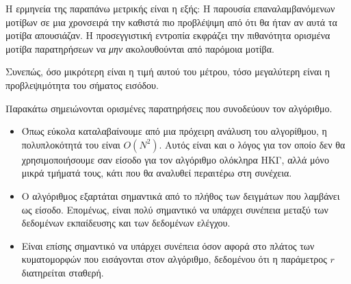 Η ερμηνεία της παραπάνω μετρικής είναι η εξής: Η παρουσία επαναλαμβανόμενων μοτίβων σε μια χρονσειρά την καθιστά πιο προβλέψιμη από ότι θα ήταν αν αυτά τα μοτίβα απουσιάζαν. Η προσεγγιστική εντροπία εκφράζει την πιθανότητα ορισμένα μοτίβα παρατηρήσεων να \emph{μην} ακολουθούνται από παρόμοια μοτίβα.

Συνεπώς, όσο μικρότερη είναι η τιμή αυτού του μέτρου, τόσο μεγαλύτερη είναι η προβλεψιμότητα του σήματος εισόδου.

Παρακάτω σημειώνονται ορισμένες παρατηρήσεις που συνοδεύουν τον αλγόριθμο.

\begin{itemize}
    \item Όπως εύκολα καταλαβαίνουμε από μια πρόχειρη ανάλυση του αλγορίθμου, η πολυπλοκότητά του είναι $O(N^2)$. Αυτός είναι και ο λόγος για τον οποίο δεν θα χρησιμοποιήσουμε σαν είσοδο για τον αλγόριθμο ολόκληρα ΗΚΓ, αλλά μόνο μικρά τμήματά τους, κάτι που θα αναλυθεί περαιτέρω στη συνέχεια.
    \item Ο αλγόριθμος εξαρτάται σημαντικά από το πλήθος των δειγμάτων που λαμβάνει ως είσοδο. Επομένως, είναι πολύ σημαντικό να υπάρχει συνέπεια μεταξύ των δεδομένων εκπαίδευσης και των δεδομένων ελέγχου.
    \item Είναι επίσης σημαντικό να υπάρχει συνέπεια όσον αφορά στο πλάτος των κυματομορφών που εισάγονται στον αλγόριθμο, δεδομένου ότι η παράμετρος $r$ διατηρείται σταθερή.
\end{itemize}

